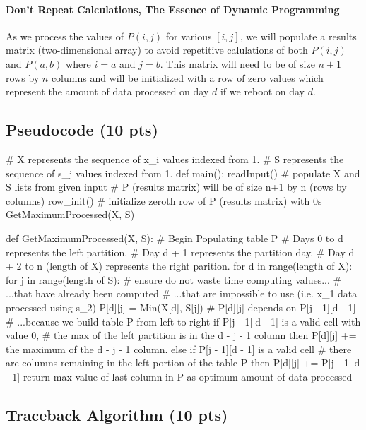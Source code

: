\documentclass[12pt]{article}
\begin{document}
\paragraph{Don't Repeat Calculations, The Essence of Dynamic Programming}
As we process the values of $P(i, j)$ for various $[i, j]$, we will populate a results matrix (two-dimensional array) to avoid repetitive calulations of both $P(i, j)$ and $P(a, b)$ where $i = a$ and $j = b$.
This matrix will need to be of size $n+1$ rows by $n$ columns and will be initialized with a row of zero values which represent the amount of data processed on day $d$ if we reboot on day $d$.
\subsection{Pseudocode (10 pts)}
\begin{verbatimtab}[4]
# X represents the sequence of x_i values indexed from 1.
# S represents the sequence of s_j values indexed from 1.
def main():
	readInput()	# populate X and S lists from given input
	# P (results matrix) will be of size n+1 by n (rows by columns)
	row_init()	# initialize zeroth row of P (results matrix) with 0s
	GetMaximumProcessed(X, S)

def GetMaximumProcessed(X, S):
	# Begin Populating table P
	# Days 0 to d represents the left partition.
	# Day d + 1 represents the partition day.
	# Day d + 2 to n (length of X) represents the right parition.
	for d in range(length of X):
		for j in range(length of S):
			# ensure do not waste time computing values...
			# ...that have already been computed
			# ...that are impossible to use (i.e. x_1 data processed using s_2)
			P[d][j] = Min(X[d], S[j])
			# P[d][j] depends on P[j - 1][d - 1]
			# ...because we build table P from left to right
			if P[j - 1][d - 1] is a valid cell with value 0,
				# the max of the left partition is in the d - j - 1 column
				then P[d][j] += the maximum of the d - j - 1 column.
			else if  P[j - 1][d - 1] is a valid cell
				# there are columns remaining in the left portion of the table P
				then P[d][j] += P[j - 1][d - 1]
	return max value of last column in P as optimum amount of data processed

\end{verbatimtab}
\subsection{Traceback Algorithm (10 pts)}
\end{document}
